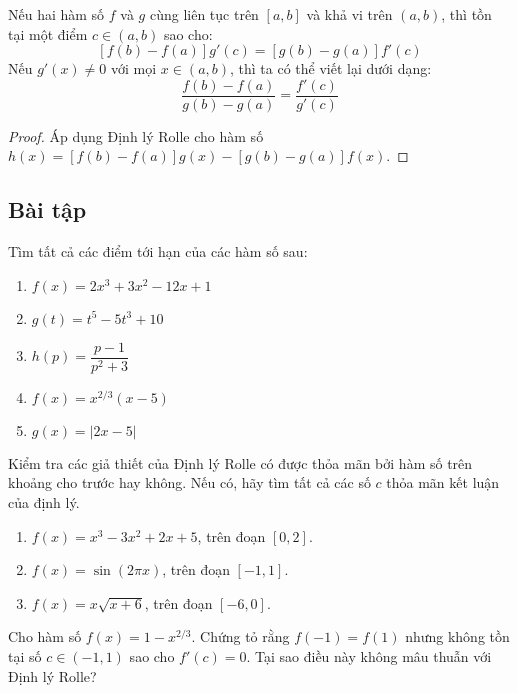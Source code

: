 \begin{theorem}\label{thm:cauchy-mean-value}
Nếu hai hàm số $f$ và $g$ cùng liên tục trên $[a, b]$ và khả vi trên $(a, b)$, thì tồn tại một điểm $c \in (a, b)$ sao cho:
$$ [f(b) - f(a)]g'(c) = [g(b) - g(a)]f'(c) $$
Nếu $g'(x) \neq 0$ với mọi $x \in (a,b)$, thì ta có thể viết lại dưới dạng:
$$ \dfrac{f(b) - f(a)}{g(b) - g(a)} = \dfrac{f'(c)}{g'(c)} $$
\end{theorem}

\begin{proof}
Áp dụng Định lý Rolle cho hàm số $h(x) = [f(b) - f(a)]g(x) - [g(b) - g(a)]f(x)$.
\end{proof}

\subsection{Bài tập}

\begin{exercise}
Tìm tất cả các điểm tới hạn của các hàm số sau:
\begin{enumerate}[label=(\alph*)]
    \item $f(x) = 2x^3 + 3x^2 - 12x + 1$
    \item $g(t) = t^5 - 5t^3 + 10$
    \item $h(p) = \dfrac{p-1}{p^2+3}$
    \item $f(x) = x^{2/3}(x-5)$
    \item $g(x) = |2x-5|$
\end{enumerate}
\end{exercise}

\begin{exercise}
Kiểm tra các giả thiết của Định lý Rolle có được thỏa mãn bởi hàm số trên khoảng cho trước hay không. Nếu có, hãy tìm tất cả các số $c$ thỏa mãn kết luận của định lý.
\begin{enumerate}[label=(\alph*)]
    \item $f(x) = x^3 - 3x^2 + 2x + 5$, trên đoạn $[0, 2]$.
    \item $f(x) = \sin(2\pi x)$, trên đoạn $[-1, 1]$.
    \item $f(x) = x\sqrt{x+6}$, trên đoạn $[-6, 0]$.
\end{enumerate}
\end{exercise}

\begin{exercise}
Cho hàm số $f(x) = 1 - x^{2/3}$. Chứng tỏ rằng $f(-1) = f(1)$ nhưng không tồn tại số $c \in (-1,1)$ sao cho $f'(c)=0$. Tại sao điều này không mâu thuẫn với Định lý Rolle?
\end{exercise}

